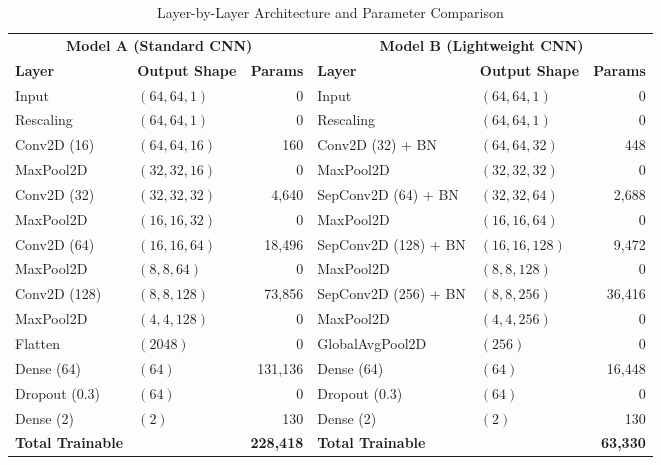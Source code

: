 \documentclass[11pt]{article}
\begin{document}
	\begin{table}[H]
		\centering
		\small
		\caption{Layer-by-Layer Architecture and Parameter Comparison}
		\label{tab:layer_summary}
		\begin{tabular}{llrllr}
			\toprule
			\multicolumn{3}{c}{\textbf{Model A (Standard CNN)}} & \multicolumn{3}{c}{\textbf{Model B (Lightweight CNN)}} \\
			\cmidrule(r){1-3} \cmidrule(l){4-6}
			\textbf{Layer} & \textbf{Output Shape} & \textbf{Params} & \textbf{Layer} & \textbf{Output Shape} & \textbf{Params} \\
			\midrule
			Input & $(64, 64, 1)$ & 0 & Input & $(64, 64, 1)$ & 0 \\
			Rescaling & $(64, 64, 1)$ & 0 & Rescaling & $(64, 64, 1)$ & 0 \\
			Conv2D (16) & $(64, 64, 16)$ & 160 & Conv2D (32) + BN & $(64, 64, 32)$ & 448 \\
			MaxPool2D & $(32, 32, 16)$ & 0 & MaxPool2D & $(32, 32, 32)$ & 0 \\
			Conv2D (32) & $(32, 32, 32)$ & 4,640 & SepConv2D (64) + BN & $(32, 32, 64)$ & 2,688 \\
			MaxPool2D & $(16, 16, 32)$ & 0 & MaxPool2D & $(16, 16, 64)$ & 0 \\
			Conv2D (64) & $(16, 16, 64)$ & 18,496 & SepConv2D (128) + BN & $(16, 16, 128)$ & 9,472 \\
			MaxPool2D & $(8, 8, 64)$ & 0 & MaxPool2D & $(8, 8, 128)$ & 0 \\
			Conv2D (128) & $(8, 8, 128)$ & 73,856 & SepConv2D (256) + BN & $(8, 8, 256)$ & 36,416 \\
			MaxPool2D & $(4, 4, 128)$ & 0 & MaxPool2D & $(4, 4, 256)$ & 0 \\
			Flatten & $(2048)$ & 0 & GlobalAvgPool2D & $(256)$ & 0 \\
			Dense (64) & $(64)$ & 131,136 & Dense (64) & $(64)$ & 16,448 \\
			Dropout (0.3) & $(64)$ & 0 & Dropout (0.3) & $(64)$ & 0 \\
			Dense (2) & $(2)$ & 130 & Dense (2) & $(2)$ & 130 \\
			\midrule
			\textbf{Total Trainable} & & \textbf{228,418} & \textbf{Total Trainable} & & \textbf{63,330} \\
			\bottomrule
		\end{tabular}
	\end{table}
\end{document}
